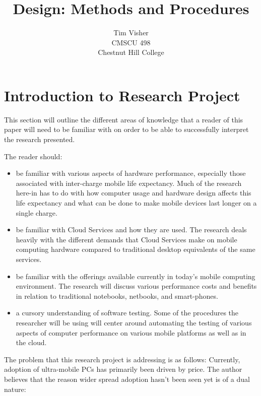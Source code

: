 \documentclass[12pt,oneside,letterpaper,titlepage]{article}
\author{Tim Visher\\ CMSCU 498\\ Chestnut Hill College}
\title{Design: Methods and Procedures}
\begin{document}
\maketitle

\tableofcontents

\newpage

\section{Introduction to Research Project}

This section will outline the different areas of knowledge that a reader of this
paper will need to be familiar with on order to be able to successfully
interpret the research presented.

The reader should:

\begin{itemize}

\item be familiar with various aspects of hardware performance, especially those
  associated with inter-charge mobile life expectancy.  Much of the research
  here-in has to do with how computer usage and hardware design affects this
  life expectancy and what can be done to make mobile devices last longer on a
  single charge.

\item be familiar with Cloud Services and how they are used.  The research deals
  heavily with the different demands that Cloud Services make on mobile
  computing hardware compared to traditional desktop equivalents of the same
  services.

\item be familiar with the offerings available currently in today's mobile
  computing environment.  The research will discuss various performance costs
  and benefits in relation to traditional notebooks, netbooks, and smart-phones.

\item a cursory understanding of software testing.  Some of the procedures the
  researcher will be using will center around automating the testing of various
  aspects of computer performance on various mobile platforms as well as in the
  cloud.

\end{itemize}

The problem that this research project is addressing is as follows: Currently,
adoption of ultra-mobile PCs has primarily been driven by price.  The author
believes that the reason wider spread adoption hasn't been seen yet is of a dual
nature:
\end{document}
